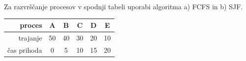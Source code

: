 \begin{Exercise}
Za razvrščanje procesov v spodnji tabeli uporabi algoritma a) FCFS in b) SJF.
\par\vspace{5pt}
{\centering
\begin{tabular}{r|ccccc}
	proces & A & B & C & D & E \\
	\hline
	trajanje & 50 & 40 & 30 & 20 & 10 \\
	čas prihoda & 0 & 5 & 10 & 15 & 20 \\
\end{tabular}\\}
\end{Exercise}
